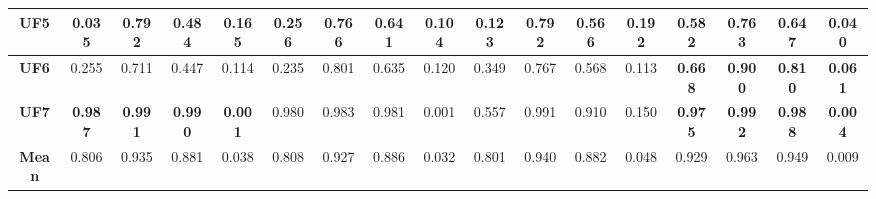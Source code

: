 \begin{table*}[t]
{\begin{tabular}{cc|c|c|c|c|c|c|c|c|c|c|c|c|c|c|c}
\multicolumn{1}{c|}{\textbf{UF5}}   & 0.035          & 0.792          & 0.484          & 0.165          & 0.256          & 0.766          & 0.641          & 0.104          & 0.123          & 0.792          & 0.566          & 0.192          & \textbf{0.582} & \textbf{0.763} & \textbf{0.647} & \textbf{0.040} \\ \hline
\multicolumn{1}{c|}{\textbf{UF6}}   & 0.255          & 0.711          & 0.447          & 0.114          & 0.235          & 0.801          & 0.635          & 0.120          & 0.349          & 0.767          & 0.568          & 0.113          & \textbf{0.668} & \textbf{0.900} & \textbf{0.810} & \textbf{0.061} \\ \hline
\multicolumn{1}{c|}{\textbf{UF7}}   & \textbf{0.987} & \textbf{0.991} & \textbf{0.990} & \textbf{0.001} & 0.980          & 0.983          & 0.981          & 0.001          & 0.557          & 0.991          & 0.910          & 0.150          & \textbf{0.975} & \textbf{0.992} & \textbf{0.988} & \textbf{0.004} \\ \hline
\multicolumn{1}{c|}{\textbf{Mean}}  & 0.806          & 0.935          & 0.881          & 0.038          & 0.808          & 0.927          & 0.886          & 0.032          & 0.801          & 0.940          & 0.882          & 0.048          & 0.929          & 0.963          & 0.949          & 0.009          \\ \hline
\end{tabular}%
}
\end{table*}



